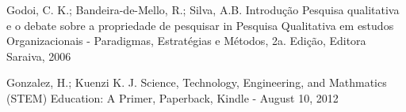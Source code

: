 \documentclass[
12pt,		%
openright,	%
twoside,  %
a4paper,			%
chapter=TITLE,		%
english,			%
french,				%
spanish,			%
brazil				%
]{USPSC-classe/USPSC}
\begin{document}
\begin{flushleft}
\begin{flushleft}
\begin{flushleft}
\begin{flushleft}
\begin{flushleft}
\begin{flushleft}
\begin{flushleft}
\begin{flushleft}
\begin{flushleft}
[GODOI et al., 2006] Godoi, C. K.; Bandeira-de-Mello, R.; Silva, A.B. Introdu\c{c}\~ao Pesquisa qualitativa e o debate sobre a propriedade de pesquisar in Pesquisa Qualitativa em estudos Organizacionais - Paradigmas, Estrat\'egias e M\'etodos, 2a. Edi\c{c}\~ao, Editora Saraiva, 2006
\end{flushleft}


\end{flushleft}


\end{flushleft}


\end{flushleft}


\end{flushleft}


\end{flushleft}


\end{flushleft}


\end{flushleft}


\end{flushleft}


\begin{flushleft}
\begin{flushleft}
\begin{flushleft}
\begin{flushleft}
\begin{flushleft}
\begin{flushleft}
\begin{flushleft}
\begin{flushleft}
\begin{flushleft}
 Gonzalez, H.; Kuenzi K. J. Science, Technology, Engineering, and Mathmatics (STEM) Education: A Primer, Paperback, Kindle - August 10, 2012
\end{flushleft}


\end{flushleft}


\end{flushleft}


\end{flushleft}


\end{flushleft}


\end{flushleft}


\end{flushleft}


\end{flushleft}


\end{flushleft}
\end{document}
